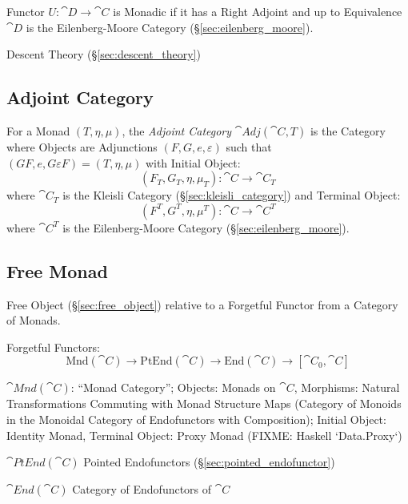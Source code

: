 Functor $U : \cat{D} \rightarrow \cat{C}$ is Monadic if it has a
Right Adjoint and up to Equivalence $\cat{D}$ is the
Eilenberg-Moore Category (\S\ref{sec:eilenberg_moore}).
\cite{lambek-scott88}

Descent Theory (\S\ref{sec:descent_theory})



\subsection{Adjoint Category}\label{sec:adjoint_category}

For a Monad $(T,\eta,\mu)$, the \emph{Adjoint Category}
$\cat{Adj}(\cat{C}, T)$ is the Category where Objects are
Adjunctions $(F,G,e,\varepsilon)$ such that $(GF,e,G \varepsilon F) =
(T,\eta,\mu)$ with Initial Object:
\[
  (F_T, G_T, \eta, \mu_T) : \cat{C} \rightarrow \cat{C}_T
\]
where $\cat{C}_T$ is the Kleisli Category
(\S\ref{sec:kleisli_category}) and Terminal Object:
\[
  (F^T, G^T, \eta, \mu^T) : \cat{C} \rightarrow \cat{C}^T
\]
where $\cat{C}^T$ is the Eilenberg-Moore Category
(\S\ref{sec:eilenberg_moore}).



\subsection{Free Monad}\label{sec:free_monad}

Free Object (\S\ref{sec:free_object}) relative to a Forgetful Functor
from a Category of Monads.

Forgetful Functors:
\[
  \mathrm{Mnd}(\cat{C}) \rightarrow \mathrm{PtEnd}(\cat{C})
  \rightarrow \mathrm{End}(\cat{C}) \rightarrow [\cat{C}_0, \cat{C}]
\]

$\cat{Mnd}(\cat{C})$: ``Monad Category''; Objects: Monads on
$\cat{C}$, Morphisms: Natural Transformations Commuting with Monad
Structure Maps (Category of Monoids in the Monoidal Category of
Endofunctors with Composition); Initial Object: Identity Monad,
Terminal Object: Proxy Monad (FIXME: Haskell `Data.Proxy`)

$\cat{PtEnd}(\cat{C})$ Pointed Endofunctors
(\S\ref{sec:pointed_endofunctor})

$\cat{End}(\cat{C})$ Category of Endofunctors of $\cat{C}$

